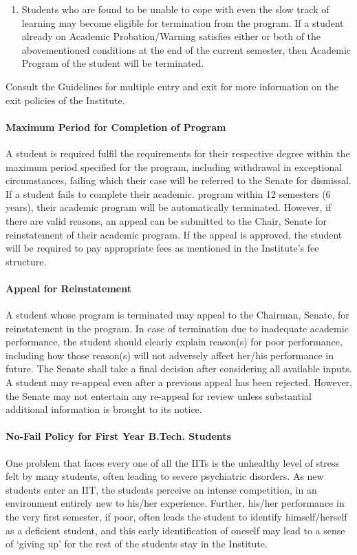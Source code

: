 \begin{enumerate}[leftmargin=15mm]
    \item Students who are found to be unable to cope with even the slow track of learning may become eligible for termination from the program. If a student already on Academic Probation/Warning satisfies either or both of the abovementioned conditions at the end of the current semester, then Academic Program of the student will be terminated.
\end{enumerate}

Consult the Guidelines for multiple entry and exit for more information on the exit policies of the Institute.

\paragraph{Maximum Period for Completion of Program} A student is required fulfil the requirements for their respective degree within the maximum period specified for the program, including withdrawal in exceptional circumstances, failing which their case will be referred to the Senate for dismissal. If a student fails to complete their academic. program within 12 semesters (6 years), their academic program will be automatically terminated. However, if there are valid reasons, an appeal can be submitted to the Chair, Senate for reinstatement of their academic program. If the appeal is approved, the student will be required to pay appropriate fees as mentioned in the Institute's fee structure.

\paragraph{Appeal for Reinstatement} A student whose program is terminated may appeal to the Chairman, Senate, for reinstatement in the program. In case of termination due to inadequate academic performance, the student should clearly explain reason(s) for poor performance, including how those reason(s) will not adversely affect her/his performance in future. The Senate shall take a final decision after considering all available inputs. A student may re-appeal even after a previous appeal has been rejected. However, the Senate may not entertain any re-appeal for review unless substantial additional information is brought to its notice.

\paragraph{No-Fail Policy for First Year B.Tech. Students} One problem that faces every one of all the IITs is the unhealthy level of stress felt by many students, often leading to severe psychiatric disorders. As new students enter an IIT, the students perceive an intense competition, in an environment entirely new to his/her experience. Further, his/her performance in the very first semester, if poor, often leads the student to identify himself/herself as a deficient student, and this early identification of oneself may lead to a sense of ‘giving up’ for the rest of the students stay in the Institute.

